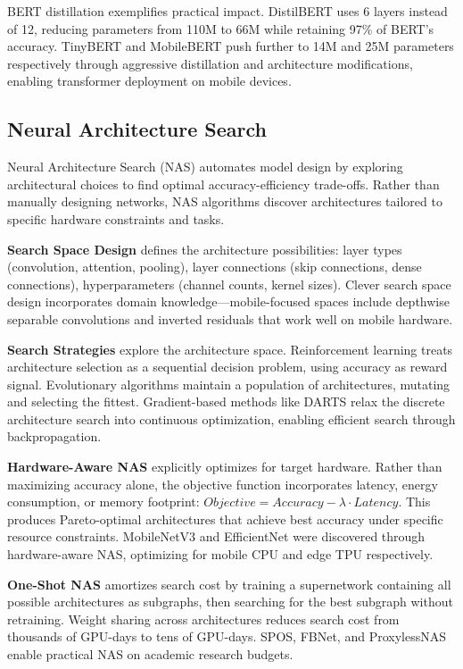 BERT distillation exemplifies practical impact. DistilBERT uses 6 layers instead of 12, reducing parameters from 110M to 66M while retaining 97\% of BERT's accuracy. TinyBERT and MobileBERT push further to 14M and 25M parameters respectively through aggressive distillation and architecture modifications, enabling transformer deployment on mobile devices.

\subsection{Neural Architecture Search}

Neural Architecture Search (NAS) automates model design by exploring architectural choices to find optimal accuracy-efficiency trade-offs. Rather than manually designing networks, NAS algorithms discover architectures tailored to specific hardware constraints and tasks.

\textbf{Search Space Design} defines the architecture possibilities: layer types (convolution, attention, pooling), layer connections (skip connections, dense connections), hyperparameters (channel counts, kernel sizes). Clever search space design incorporates domain knowledge---mobile-focused spaces include depthwise separable convolutions and inverted residuals that work well on mobile hardware.

\textbf{Search Strategies} explore the architecture space. Reinforcement learning treats architecture selection as a sequential decision problem, using accuracy as reward signal. Evolutionary algorithms maintain a population of architectures, mutating and selecting the fittest. Gradient-based methods like DARTS relax the discrete architecture search into continuous optimization, enabling efficient search through backpropagation.

\textbf{Hardware-Aware NAS} explicitly optimizes for target hardware. Rather than maximizing accuracy alone, the objective function incorporates latency, energy consumption, or memory footprint: $Objective = Accuracy - \lambda \cdot Latency$. This produces Pareto-optimal architectures that achieve best accuracy under specific resource constraints. MobileNetV3 and EfficientNet were discovered through hardware-aware NAS, optimizing for mobile CPU and edge TPU respectively.

\textbf{One-Shot NAS} amortizes search cost by training a supernetwork containing all possible architectures as subgraphs, then searching for the best subgraph without retraining. Weight sharing across architectures reduces search cost from thousands of GPU-days to tens of GPU-days. SPOS, FBNet, and ProxylessNAS enable practical NAS on academic research budgets.


